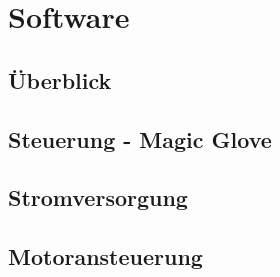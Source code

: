 \chapter{Software}

\section{Überblick}
\section{Steuerung - Magic Glove}
\section{Stromversorgung}
\section{Motoransteuerung}
